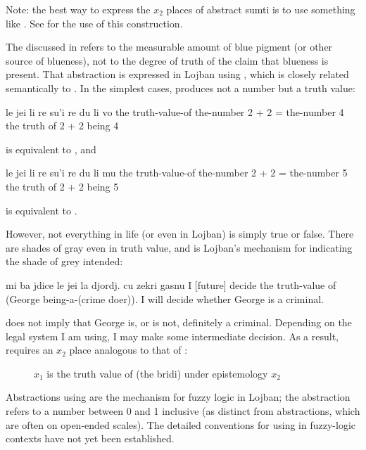 Note: the best way to express the $x_2$ places of abstract sumti
    is to use something like . See  for the use of this construction.




The  discussed in  refers to the measurable amount of
    blue pigment (or other source of blueness), not to the degree
    of truth of the claim that blueness is present. That
    abstraction is expressed in Lojban using , which is
    closely related semantically to . In the simplest cases,
     produces not a number but a truth value:
\begin{example}
le jei li re su'i re du li vo \n
the truth-value-of the-number 2 + 2 = the-number 4\n
the truth of 2 + 2 being 4
\end{example}

{\noindent}is equivalent to , and
\begin{example}
le jei li re su'i re du li mu \n
the truth-value-of the-number 2 + 2 = the-number 5\n
the truth of 2 + 2 being 5
\end{example}

{\noindent}is equivalent to . 

However, not everything in life (or even in Lojban) is
    simply true or false. There are shades of gray even in truth
    value, and  is Lojban's mechanism for indicating the
    shade of grey intended:
\begin{example}
mi ba jdice le jei\n
\T	la djordj. cu zekri gasnu \n
I [future] decide the truth-value of\n
\T	(George being-a-(crime doer)).\n
I will decide whether George is a criminal.
\end{example}

 does not imply that George is,
    or is not, definitely a criminal. Depending on the legal system
    I am using, I may make some intermediate decision. As a result,
     requires an $x_2$ place analogous to that of : 
\begin{description}
\item[] $x_1$ is the truth value of (the bridi) under epistemology $x_2$
\end{description}

Abstractions using  are the mechanism for fuzzy logic in
    Lojban; the  abstraction refers to a number between 0
    and 1 inclusive (as distinct from  abstractions, which
    are often on open-ended scales). The detailed conventions for
    using  in fuzzy-logic contexts have not yet been
    established.



